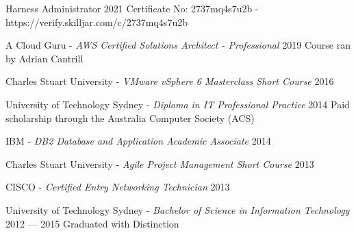 
\begin{education}
  \eduitem
  {Harness Administrator} %
  {2021} %
  {Certificate No: 2737mq4s7u2b - https://verify.skilljar.com/c/2737mq4s7u2b} %

  \eduitem
  {A Cloud Guru - \emph{AWS Certified Solutions Architect - Professional}} %
  {2019} %
  {Course ran by Adrian Cantrill} %

  \eduitem
  {Charles Stuart University - \emph{VMware vSphere 6 Masterclass Short Course}} %
  {2016} %
  {} %
  
  \eduitem
  {University of Technology Sydney - \emph{Diploma in IT Professional Practice}} %
  {2014} %
  {Paid scholarship through the Australia Computer Society (ACS)} %

  \eduitem
  {IBM - \emph{DB2 Database and Application Academic Associate}} %
  {2014} %
  {} %
  
  \eduitem
  {Charles Stuart University - \emph{Agile Project Management Short Course}} %
  {2013} %
  {} %

  \eduitem
  {CISCO - \emph{Certified Entry Networking Technician}} %
  {2013} %
  {} %

  \eduitem
  {University of Technology Sydney - \emph{Bachelor of Science in Information Technology}} %
  {2012 --- 2015} %
  {Graduated with Distinction} %


\end{education}

